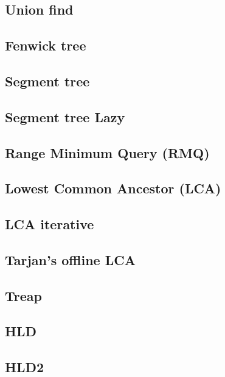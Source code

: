 \documentclass[a4paper]{article}
\begin{document}
\begin{multicols*}{3}
    \subsection{Union find}
        
    \subsection{Fenwick tree}
        
    \subsection{Segment tree}
        
    \subsection{Segment tree Lazy}
        
    \subsection{Range Minimum Query (RMQ)}
        
    \subsection{Lowest Common Ancestor (LCA)}
        
    \subsection{LCA iterative}
        
    \subsection{Tarjan's offline LCA}
        
    \subsection{Treap}
        
    \subsection{HLD}
        
    \subsection{HLD2}
            


\end{multicols*}
\end{document}
